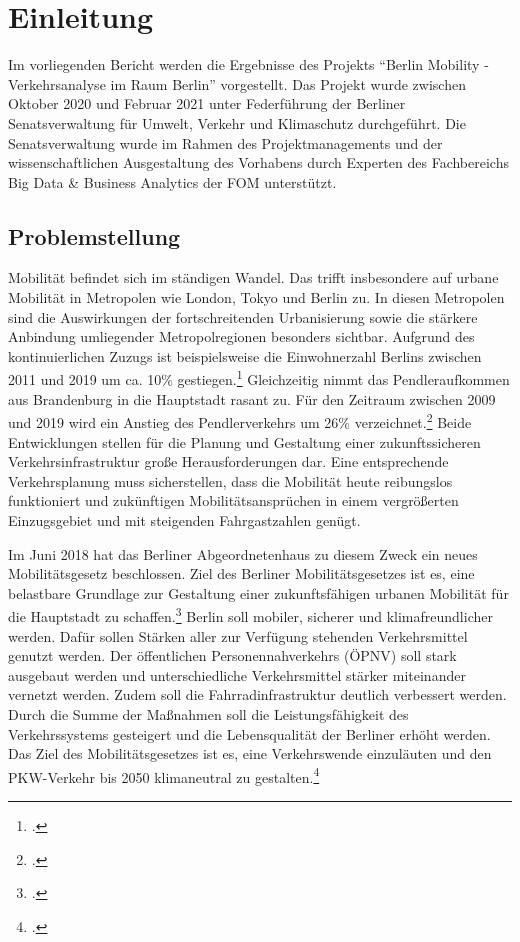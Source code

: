 \section{Einleitung}
Im vorliegenden Bericht werden die Ergebnisse des Projekts \enquote{Berlin Mobility - Verkehrsanalyse im Raum Berlin} vorgestellt. Das Projekt wurde zwischen Oktober 2020 und Februar 2021 unter Federführung der Berliner Senatsverwaltung für Umwelt, Verkehr und Klimaschutz durchgeführt. Die Senatsverwaltung wurde im Rahmen des Projektmanagements und der wissenschaftlichen Ausgestaltung des Vorhabens durch Experten des Fachbereichs Big Data \& Business Analytics der \ac{FOM} unterstützt.

\subsection{Problemstellung}\label{problems}
Mobilität befindet sich im ständigen Wandel. Das trifft insbesondere auf urbane Mobilität in Metropolen wie London, Tokyo und Berlin zu. In diesen Metropolen sind die Auswirkungen der fortschreitenden Urbanisierung sowie die stärkere Anbindung umliegender Metropolregionen besonders sichtbar. Aufgrund des kontinuierlichen Zuzugs ist beispielsweise die Einwohnerzahl Berlins zwischen 2011 und 2019 um ca. 10\% gestiegen.\footcite{Statista.2020} Gleichzeitig nimmt das Pendleraufkommen aus Brandenburg in die Hauptstadt rasant zu. Für den Zeitraum zwischen 2009 und 2019 wird ein Anstieg des Pendlerverkehrs um 26\% verzeichnet.\footcite{VBB-Pendlerblatt.2020} %
Beide Entwicklungen stellen für die Planung und Gestaltung einer zukunftssicheren Verkehrsinfrastruktur große Herausforderungen dar. Eine entsprechende Verkehrsplanung muss sicherstellen, dass die Mobilität heute reibungslos funktioniert und zukünftigen Mobilitätsansprüchen in einem vergrößerten Einzugsgebiet und mit steigenden Fahrgastzahlen genügt.

Im Juni 2018 hat das Berliner Abgeordnetenhaus zu diesem Zweck ein neues Mobilitätsgesetz beschlossen. Ziel des Berliner Mobilitätsgesetzes ist es, eine belastbare Grundlage zur Gestaltung einer zukunftsfähigen urbanen Mobilität für die Hauptstadt zu schaffen.\footcite{Mobilitaetsgesetz.2020} Berlin soll mobiler, sicherer und klimafreundlicher werden. Dafür sollen Stärken aller zur Verfügung stehenden Verkehrsmittel genutzt werden. Der öffentlichen Personennahverkehrs (ÖPNV) soll stark ausgebaut werden und unterschiedliche Verkehrsmittel stärker miteinander vernetzt werden. Zudem soll die Fahrradinfrastruktur deutlich verbessert werden. Durch die Summe der Maßnahmen soll die Leistungsfähigkeit des Verkehrssystems gesteigert und die Lebensqualität der Berliner erhöht werden. Das Ziel des Mobilitätsgesetzes ist es, eine Verkehrswende einzuläuten und den PKW-Verkehr bis 2050 klimaneutral zu gestalten.\footcite{Mobilitaetsgesetz.2020}


